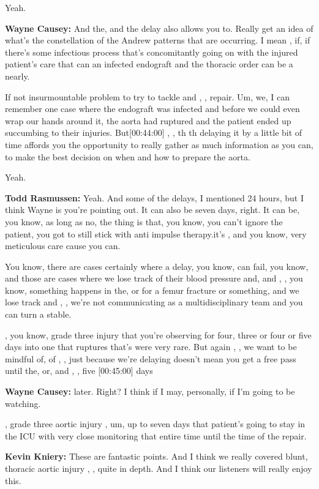 \documentclass[
]{book}
\begin{document}
Yeah.

\textbf{Wayne Causey:} And the, and the delay also allows you to. Really get
an idea of what's the constellation of the Andrew patterns that are
occurring. I mean , if, if there's some infectious process that's
concomitantly going on with the injured patient's care that can an
infected endograft and the thoracic order can be a nearly.

If not insurmountable problem to try to tackle and , , repair. Um, we, I
can remember one case where the endograft was infected and before we
could even wrap our hands around it, the aorta had ruptured and the
patient ended up succumbing to their injuries. But{[}00:44:00{]} , , th th
delaying it by a little bit of time affords you the opportunity to
really gather as much information as you can, to make the best decision
on when and how to prepare the aorta.

Yeah.

\textbf{Todd Rasmussen:} Yeah. And some of the delays, I mentioned 24 hours,
but I think Wayne is you're pointing out. It can also be seven days,
right. It can be, you know, as long as no, the thing is that, you know,
you can't ignore the patient, you got to still stick with anti impulse
therapy.it's , and you know, very meticulous care cause you can.

You know, there are cases certainly where a delay, you know, can fail,
you know, and those are cases where we lose track of their blood
pressure and, and , , you know, something happens in the, or for a femur
fracture or something, and we lose track and , , we're not communicating
as a multidisciplinary team and you can turn a stable.

, you know, grade three injury that you're observing for four, three or
four or five days into one that ruptures that's were very rare. But
again , , we want to be mindful of, of , , just because we're delaying
doesn't mean you get a free pass until the, or, and , , five {[}00:45:00{]}
days

\textbf{Wayne Causey:} later. Right? I think if I may, personally, if I'm
going to be watching.

, grade three aortic injury , um, up to seven days that patient's going
to stay in the ICU with very close monitoring that entire time until the
time of the repair.

\textbf{Kevin Kniery:} These are fantastic points. And I think we really
covered blunt, thoracic aortic injury , , quite in depth. And I think
our listeners will really enjoy this.
\end{document}
